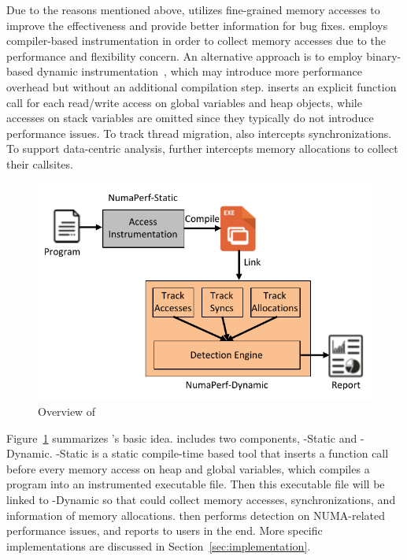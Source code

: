 Due to the reasons mentioned above, \NP{} utilizes fine-grained memory accesses to improve the effectiveness and provide better information for bug fixes. \NP{} employs compiler-based instrumentation in order to collect memory accesses due to the performance and flexibility concern. An alternative approach is to employ binary-based dynamic instrumentation~\cite{DynamoRlO, Valgrind, Pin}, which may introduce more performance overhead but without an additional compilation step. \NP{} inserts an explicit function call for each read/write access on global variables and heap objects, while accesses on stack variables are omitted since they typically do not introduce performance issues. To track thread migration, \NP{} also intercepts synchronizations. To support data-centric analysis, \NP{} further intercepts memory allocations to collect their callsites.  
\begin{figure}[!htbp]
\centering
\includegraphics[width=0.98\columnwidth]{figures/overview.pdf}
\caption{Overview of \NP{}\label{fig:overview}}
\vspace{-0.2in}
\end{figure}

Figure~\ref{fig:overview} summarizes \NP{}'s basic idea.  \NP{} includes two components, \NP{}-Static and \NP{}-Dynamic. \NP{}-Static is a static compile-time based tool that inserts a function call before every memory access on heap and global variables, which compiles a program into an instrumented executable file. Then this executable file will be linked to \NP{}-Dynamic so that \NP{} could collect memory accesses, synchronizations, and information of memory allocations. \NP{} then performs detection on NUMA-related performance issues, and reports to users in the end.  More specific implementations are discussed in Section~\ref{sec:implementation}. 
